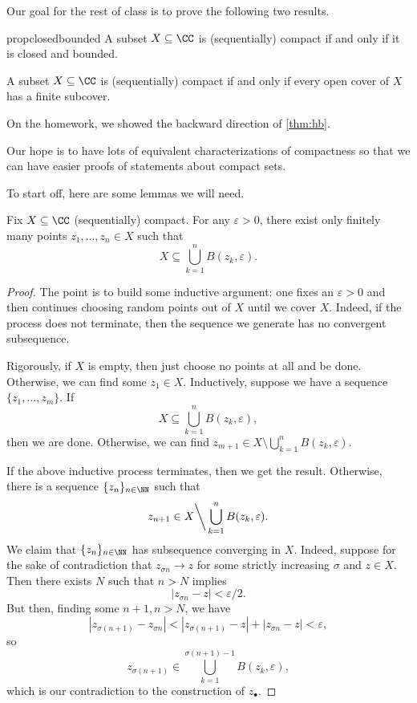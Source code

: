 Our goal for the rest of class is to prove the following two results.
\begin{restatable}{prop}{closedbounded}
	A subset $X\subseteq\CC$ is (sequentially) compact if and only if it is closed and bounded.
\end{restatable}
\begin{theorem} \label{thm:hb}
	A subset $X\subseteq\CC$ is (sequentially) compact if and only if every open cover of $X$ has a finite subcover.
\end{theorem}
On the homework, we showed the backward direction of \autoref{thm:hb}.
\begin{remark}
	Our hope is to have lots of equivalent characterizations of compactness so that we can have easier proofs of statements about compact sets.
\end{remark}
To start off, here are some lemmas we will need.
\begin{lemma}
	Fix $X\subseteq\CC$ (sequentially) compact. For any $\varepsilon>0$, there exist only finitely many points $z_1,\ldots,z_n\in X$ such that
	\[X\subseteq\bigcup_{k=1}^nB(z_k,\varepsilon).\]
\end{lemma}
\begin{proof}
	The point is to build some inductive argument: one fixes an $\varepsilon>0$ and then continues choosing random points out of $X$ until we cover $X$. Indeed, if the process does not terminate, then the sequence we generate has no convergent subsequence.

	Rigorously, if $X$ is empty, then just choose no points at all and be done. Otherwise, we can find some $z_1\in X$. Inductively, suppose we have a sequence $\{z_1,\ldots,z_m\}$. If
	\[X\subseteq\bigcup_{k=1}^nB(z_k,\varepsilon),\]
	then we are done. Otherwise, we can find $z_{m+1}\in X\setminus\bigcup_{k=1}^nB(z_k,\varepsilon)$.

	If the above inductive process terminates, then we get the result. Otherwise, there is a sequence $\{z_n\}_{n\in\NN}$ such that
	\[z_{n+1}\in X{\mathbin\bigg\backslash}\bigcup_{k=1}^nB(z_k,\varepsilon).\]
	We claim that $\{z_n\}_{n\in\NN}$ has subsequence converging in $X$. Indeed, suppose for the sake of contradiction that $z_{\sigma n}\to z$ for some strictly increasing $\sigma$ and $z\in X$. Then there exists $N$ such that $n>N$ implies
	\[|z_{\sigma n}-z|<\varepsilon/2.\]
	But then, finding some $n+1,n>N$, we have
	\[|z_{\sigma(n+1)}-z_{\sigma n}|<|z_{\sigma(n+1)}-z|+|z_{\sigma n}-z|<\varepsilon,\]
	so
	\[z_{\sigma(n+1)}\in\bigcup_{k=1}^{\sigma(n+1)-1}B(z_k,\varepsilon),\]
	which is our contradiction to the construction of $z_\bullet$.
\end{proof}
